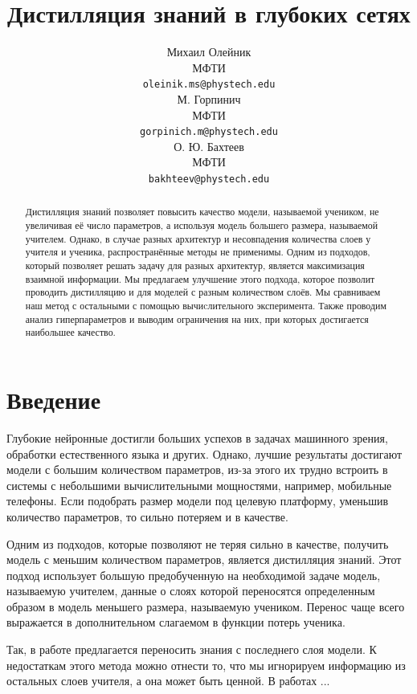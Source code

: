 \documentclass[14]{article}
\title{Дистилляция знаний в глубоких сетях}
\author{ Михаил Олейник \\ 
  МФТИ \\
  \texttt{oleinik.ms@phystech.edu} \\
  \And
  М. Горпинич \\ 
  МФТИ \\
  \texttt{gorpinich.m@phystech.edu} \\
  \And
  О. Ю. Бахтеев \\ 
  МФТИ \\ 
  \texttt{bakhteev@phystech.edu} \\
}
\date{}
\begin{document}
\maketitle

\begin{abstract}
  Дистилляция знаний позволяет повысить качество модели, называемой учеником, не увеличивая её число параметров,
  а используя модель большего размера, называемой учителем.
  Однако, в случае разных архитектур и несовпадения количества слоев у учителя и ученика, распространённые методы не применимы.
  Одним из подходов, который позволяет решать задачу для разных архитектур, является максимизация взаимной информации.
  Мы предлагаем улучшение этого подхода, которое позволит проводить дистилляцию и для моделей с разным количеством слоёв.
  Мы сравниваем наш метод с остальными с помощью вычиcлительного эксперимента.
  Также проводим анализ гиперпараметров и выводим ограничения на них, при которых достигается наибольшее качество.
\end{abstract}



\section{Введение}
Глубокие нейронные достигли больших успехов в задачах машинного зрения, обработки естественного языка и других.
Однако, лучшие результаты достигают модели с большим количеством параметров,
из-за этого их трудно встроить в системы с небольшими вычислительными мощностями, например, мобильные телефоны.
Если подобрать размер модели под целевую платформу, уменьшив количество параметров, то сильно потеряем и в качестве.

Одним из подходов, которые позволяют не теряя сильно в качестве, получить модель с меньшим количеством параметров, является дистилляция знаний.
Этот подход использует большую предобученную на необходимой задаче модель, называемую учителем,
данные о слоях которой переносятся определенным образом в модель меньшего размера, называемую учеником.
Перенос чаще всего выражается в дополнительном слагаемом в функции потерь ученика.

Так, в работе \cite{hinton2015distilling} предлагается переносить знания с последнего слоя модели.
К недостаткам этого метода можно отнести то, что мы игнорируем информацию из остальных слоев учителя, а она может быть ценной.
В работах ...
\end{document}
